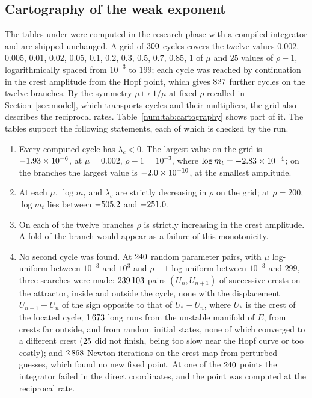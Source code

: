 \subsection{Cartography of the weak exponent}\label{num:sec:cartography}
The tables under  were computed in the research phase with a compiled integrator and are shipped unchanged. A grid of $300$ cycles covers the twelve values $0.002$, $0.005$, $0.01$, $0.02$, $0.05$, $0.1$, $0.2$, $0.3$, $0.5$, $0.7$, $0.85$, $1$ of $\mu$ and $25$ values of $\rho-1$, logarithmically spaced from $10^{-3}$ to $199$; each cycle was reached by continuation in the crest amplitude from the Hopf point, which gives $827$ further cycles on the twelve branches. By the symmetry $\mu\mapsto1/\mu$ at fixed $\rho$ recalled in Section~\ref{sec:model}, which transports cycles and their multipliers, the grid also describes the reciprocal rates. Table~\ref{num:tab:cartography} shows part of it. The tables support the following statements, each of which is checked by the run.
\begin{enumerate}[label=\textup{(\roman*)}]
\item Every computed cycle has $\lambda_c<0$. The largest value on the grid is $-1.93\times10^{-6}$, at $\mu=0.002$, $\rho-1=10^{-3}$, where $\log m_t=-2.83\times10^{-4}$; on the branches the largest value is $-2.0\times10^{-10}$, at the smallest amplitude.
\item At each $\mu$, $\log m_t$ and $\lambda_c$ are strictly decreasing in $\rho$ on the grid; at $\rho=200$, $\log m_t$ lies between $-505.2$ and $-251.0$.
\item On each of the twelve branches $\rho$ is strictly increasing in the crest amplitude. A fold of the branch would appear as a failure of this monotonicity.
\item No second cycle was found. At $240$ random parameter pairs, with $\mu$ log-uniform between $10^{-3}$ and $10^{3}$ and $\rho-1$ log-uniform between $10^{-3}$ and $299$, three searches were made: $239\,103$ pairs $(U_n,U_{n+1})$ of successive crests on the attractor, inside and outside the cycle, none with the displacement $U_{n+1}-U_n$ of the sign opposite to that of $U_\ast-U_n$, where $U_\ast$ is the crest of the located cycle; $1\,673$ long runs from the unstable manifold of $E$, from crests far outside, and from random initial states, none of which converged to a different crest ($25$ did not finish, being too slow near the Hopf curve or too costly); and $2\,868$ Newton iterations on the crest map from perturbed guesses, which found no new fixed point. At one of the $240$ points the integrator failed in the direct coordinates, and the point was computed at the reciprocal rate.
\end{enumerate}

